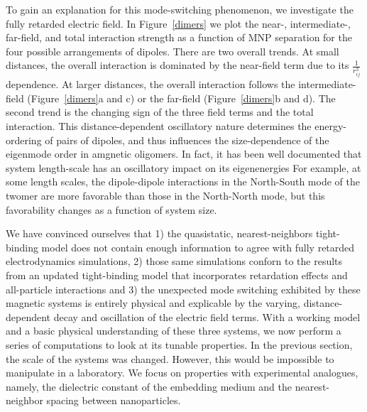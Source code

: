 \documentclass[journal=ancac3,manuscript=article]{achemso}
\begin{document}
To gain an explanation for this mode-switching phenomenon, we investigate the fully retarded electric field. In Figure~\ref{dimers} we plot the near-, intermediate-, far-field, and total interaction strength as a function of MNP separation for the four possible arrangements of dipoles. There are two overall trends. At small distances, the overall interaction is dominated by the near-field term due to its $\frac{1}{r_{ij}^3}$ dependence. At larger distances, the overall interaction follows the intermediate-field (Figure~\ref{dimers}a and c) or the far-field (Figure~\ref{dimers}b and d). The second trend is the changing sign of the three field terms and the total interaction. This distance-dependent oscillatory nature determines the energy-ordering of pairs of dipoles, and thus influences the size-dependence of the eigenmode order in amgnetic oligomers. In fact, it has been well documented that system length-scale has an oscillatory impact on its eigenenergies\cite{vonPlessen2007,Pinchuk2016} For example, at some length scales, the dipole-dipole interactions in the North-South mode of the twomer are more favorable than those in the North-North mode, but this favorability changes as a function of system size. 


We have convinced ourselves that 1) the quasistatic, nearest-neighbors tight-binding model does not contain enough information to agree with fully retarded electrodynamics simulations, 2) those same simulations conforn to the results from an updated tight-binding model that incorporates retardation effects and all-particle interactions and 3) the unexpected mode switching exhibited by these magnetic systems is entirely physical and explicable by the varying, distance-dependent decay and oscillation of the electric field terms. With a working model and a basic physical understanding of these three systems, we now perform a series of computations to look at its tunable properties. In the previous section, the scale of the systems was changed. However, this would be impossible to manipulate in a laboratory. We focus on properties with experimental analogues, namely, the dielectric constant of the embedding medium and the nearest-neighbor spacing between nanoparticles.
\end{document}
